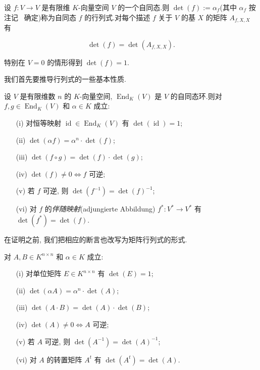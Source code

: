 \begin{definition}[自同态的行列式]\label{def:4.3.2}
设 $f \colon V \longrightarrow V$ 是有限维 $K$-向量空间 $V$ 的一个自同态.则 $\det(f) := \alpha_f$(其中 $\alpha_f$ 按注记~ 确定)称为自同态 $f$ 的行列式.对每个描述 $f$ 关于 $V$ 的基 $X$ 的矩阵 $A_{f, X, X}$ 有

\[
\det(f) = \det(A_{f, X, X}).
\]

特别在 $V = 0$ 的情形得到 $\det(f) = 1$.
\end{definition}

我们首先要推导行列式的一些基本性质.

\begin{theorem}\label{thm:4.3.3}
设 $V$ 是有限维数 $n$ 的 $K$-向量空间, $\operatorname{End}_K(V)$ 是 $V$ 的自同态环.则对 $f, g \in \operatorname{End}_K(V)$ 和 $\alpha \in K$ 成立:
\begin{enumerate}
\item[(i)] 对恒等映射 $\operatorname{id} \in \operatorname{End}_K(V)$ 有 $\det(\operatorname{id}) = 1$;
\item[(ii)] $\det(\alpha f) = \alpha^n \cdot \det(f)$;
\item[(iii)] $\det(f \circ g) = \det(f) \cdot \det(g)$;
\item[(iv)] $\det(f) \neq 0 \Longleftrightarrow f$ 可逆;
\item[(v)] 若 $f$ 可逆, 则 $\det(f^{-1}) = \det(f)^{-1}$;
\item[(vi)] 对 $f$ 的\emph{伴随映射}(\textup{adjungierte Abbildung}) $f^* \colon V^* \longrightarrow V^*$ 有 $\det(f^*) = \det(f)$.
\end{enumerate}
\end{theorem}

在证明之前, 我们把相应的断言也改写为矩阵行列式的形式.

\begin{theorem}\label{thm:4.3.4}
对 $A, B \in K^{n \times n}$ 和 $\alpha \in K$ 成立:
\begin{enumerate}
\item[(i)] 对单位矩阵 $E \in K^{n \times n}$ 有 $\det(E) = 1$;
\item[(ii)] $\det(\alpha A) = \alpha^n \cdot \det(A)$;
\item[(iii)] $\det(A \cdot B) = \det(A) \cdot \det(B)$;
\item[(iv)] $\det(A) \neq 0 \Longleftrightarrow A$ 可逆;
\item[(v)] 若 $A$ 可逆, 则 $\det(A^{-1}) = \det(A)^{-1}$;
\item[(vi)] 对 $A$ 的转置矩阵 $A^t$ 有 $\det(A^t) = \det(A)$.
\end{enumerate}
\end{theorem}

